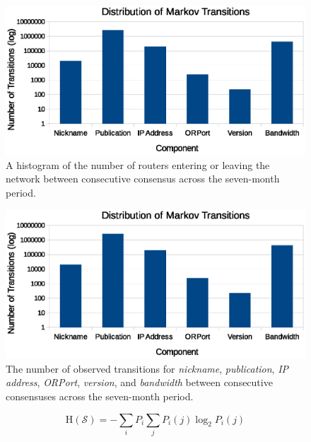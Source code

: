 \documentclass{sig-alternate}
\begin{document}
\begin{figure}[h]
	\centering
	\includegraphics[width=\linewidth]{../analysis/MarkovTransitionDistribution.eps} %
	\caption{A histogram of the number of routers entering or leaving the network between consecutive consensus across the seven-month period.}
	\label{fig:xorRouters}
\end{figure}

\begin{figure}[h]
	\centering
	\includegraphics[width=\linewidth]{../analysis/MarkovTransitionDistribution.eps}
	\caption{The number of observed transitions for \emph{nickname}, \emph{publication}, \emph{IP address}, \emph{ORPort}, \emph{version}, and \emph{bandwidth} between consecutive consensuses across the seven-month period.}
	\label{fig:transitionCount}
\end{figure}

\begin{equation}
\mathrm{H}(\mathcal{S}) = - \sum_{i} P_{i} \sum_{j} P_{i}(j) \log_{2}P_{i}(j)
\end{equation}

\end{document}
